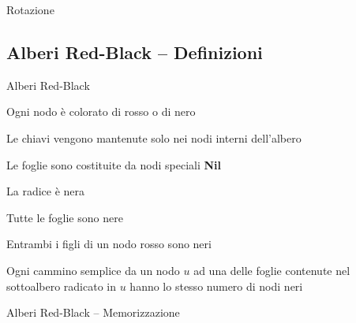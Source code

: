 \begin{frame}{Rotazione}
    

\end{frame}

\subsection{Alberi Red-Black -- Definizioni}

\begin{frame}{Alberi Red-Black}

\vspace{-6pt}
\BIL
\item Ogni nodo è colorato di \alert{rosso} o di \alert{nero}
\item Le chiavi vengono mantenute solo nei nodi interni dell'albero
\item Le foglie sono costituite da nodi speciali \textbf{Nil} 
\EIL
{}
\BEL
\item La radice è nera
\item Tutte le foglie sono nere
\item Entrambi i figli di un nodo rosso sono neri
\item Ogni cammino semplice da un nodo $u$ ad una delle foglie contenute nel sottoalbero radicato in $u$ hanno lo stesso numero di nodi neri
\EEL


\end{frame}

\begin{frame}{Alberi Red-Black -- Memorizzazione}

\end{frame}

